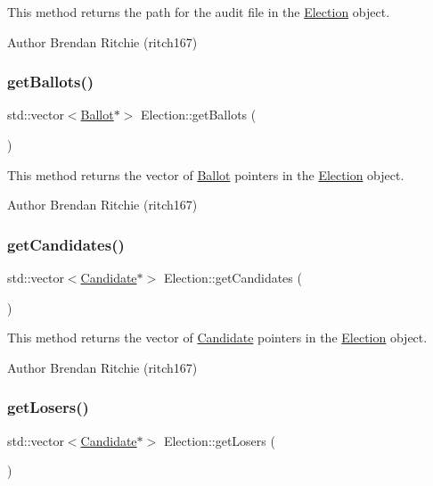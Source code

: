 This method returns the path for the audit file in the \hyperlink{classElection}{Election} object. \begin{DoxyAuthor}{Author}
Brendan Ritchie (ritch167) 
\end{DoxyAuthor}
\mbox{\label{classElection_abd0c0a7649a3f5d87541e3f65fec7244}} 
\subsubsection{\texorpdfstring{get\+Ballots()}{getBallots()}}
{\footnotesize\ttfamily std\+::vector$<$\hyperlink{classBallot}{Ballot}$\ast$$>$ Election\+::get\+Ballots (\begin{DoxyParamCaption}{ }\end{DoxyParamCaption})}

This method returns the vector of \hyperlink{classBallot}{Ballot} pointers in the \hyperlink{classElection}{Election} object. \begin{DoxyAuthor}{Author}
Brendan Ritchie (ritch167) 
\end{DoxyAuthor}
\mbox{\label{classElection_a1514ca134f88464b026cc51da5076d29}} 
\subsubsection{\texorpdfstring{get\+Candidates()}{getCandidates()}}
{\footnotesize\ttfamily std\+::vector$<$\hyperlink{classCandidate}{Candidate}$\ast$$>$ Election\+::get\+Candidates (\begin{DoxyParamCaption}{ }\end{DoxyParamCaption})}

This method returns the vector of \hyperlink{classCandidate}{Candidate} pointers in the \hyperlink{classElection}{Election} object. \begin{DoxyAuthor}{Author}
Brendan Ritchie (ritch167) 
\end{DoxyAuthor}
\mbox{\label{classElection_a34dfd0c1c6519073d38e85790c839f8b}} 
\subsubsection{\texorpdfstring{get\+Losers()}{getLosers()}}
{\footnotesize\ttfamily std\+::vector$<$\hyperlink{classCandidate}{Candidate}$\ast$$>$ Election\+::get\+Losers (\begin{DoxyParamCaption}{ }\end{DoxyParamCaption})}

